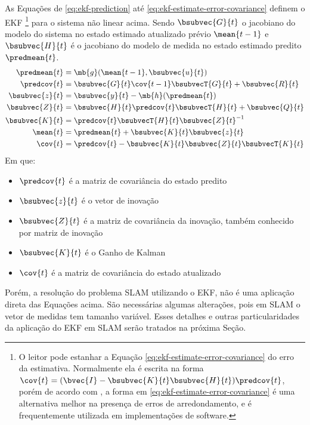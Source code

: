As Equações de \ref{eq:ekf-prediction} até \ref{eq:ekf-estimate-error-covariance} definem o EKF \footnote{O leitor pode estanhar a Equação \ref{eq:ekf-estimate-error-covariance} do erro da estimativa. Normalmente ela é escrita na forma $\cov{t} = (\bvec{I} - \bsubvec{K}{t} \bsubvec{H}{t}) \predcov{t}$, porém de acordo com , a forma em \ref{eq:ekf-estimate-error-covariance} é uma alternativa melhor na presença de erros de arredondamento, e é frequentemente utilizada em implementações de software.} para o sistema não linear acima. Sendo $\bsubvec{G}{t}$ o jacobiano do modelo do sistema no estado estimado atualizado prévio $\mean{t-1}$ e $\bsubvec{H}{t}$ é o jacobiano do modelo de medida no estado estimado predito $\predmean{t}$.
\begin{align}
  \predmean{t} &= \mb{g}(\mean{t-1}, \bsubvec{u}{t})
  \label{eq:ekf-prediction}\\
  \predcov{t} &= \bsubvec{G}{t}\cov{t-1}\bsubvecT{G}{t} + \bsubvec{R}{t}
  \label{eq:ekf-prediction-error-covariance}\\
  \bsubvec{z}{t} &= \bsubvec{y}{t} - \mb{h}(\predmean{t})
  \label{eq:ekf-inovation} \\
  \bsubvec{Z}{t} &= \bsubvec{H}{t}\predcov{t}\bsubvecT{H}{t} + \bsubvec{Q}{t}
  \label{eq:ekf-inovation-covariance} \\
  \bsubvec{K}{t} &=   \predcov{t}\bsubvecT{H}{t} \bsubvec{Z}{t}^{-1}
  \label{eq:ekf-gain}\\
  \mean{t} &= \predmean{t} + \bsubvec{K}{t} \bsubvec{z}{t}
  \label{eq:ekf-update}\\
  \cov{t} &= \predcov{t} - \bsubvec{K}{t}\bsubvec{Z}{t}\bsubvecT{K}{t}
  \label{eq:ekf-estimate-error-covariance}
\end{align}
Em que: 
\begin{itemize}
  \item $\predcov{t}$ é a matriz de covariância do estado predito
  \item $\bsubvec{z}{t}$ é o vetor de inovação
  \item $\bsubvec{Z}{t}$ é a matriz de covariância da inovação, também conhecido por matriz de inovação
  \item $\bsubvec{K}{t}$ é o Ganho de Kalman
  \item $\cov{t}$ é a matriz de covariância do estado atualizado
\end{itemize}
Porém, a resolução do problema SLAM utilizando o EKF, não é uma aplicação 
direta das Equações acima. São necessárias algumas alterações, pois em SLAM o vetor de medidas tem tamanho variável. Esses detalhes e outras particularidades da aplicação do EKF em SLAM serão tratados na próxima Seção.

